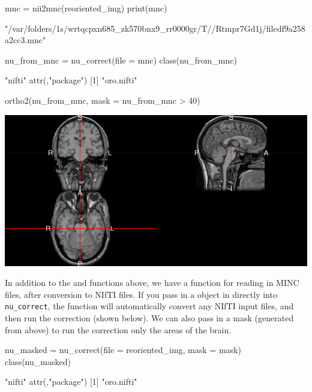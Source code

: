 \begin{Schunk}
\begin{Sinput}
mnc = nii2mnc(reoriented_img)
print(mnc)
\end{Sinput}
\begin{Soutput}
[1] "/var/folders/1s/wrtqcpxn685_zk570bnx9_rr0000gr/T//Rtmpr7Gd1j/filedf9a258a2cc3.mnc"
\end{Soutput}
\begin{Sinput}
nu_from_mnc = nu_correct(file = mnc)
class(nu_from_mnc)
\end{Sinput}
\begin{Soutput}
[1] "nifti"
attr(,"package")
[1] "oro.nifti"
\end{Soutput}
\begin{Sinput}
ortho2(nu_from_mnc, mask = nu_from_mnc > 40)
\end{Sinput}

\includegraphics{Freesurfer_files/figure-latex/nu_correct_mcn2nii-1} \end{Schunk}

In addition to the  and  functions above, we
have a  function for reading in MINC files, after
conversion to NIfTI files. If you pass in a  object in
directly into \texttt{nu\_correct}, the function will automatically
convert any NIfTI input files, and then run the correction (shown
below). We can also pass in a mask (generated from above) to run the
correction only the areas of the brain.

\begin{Schunk}
\begin{Sinput}
nu_masked = nu_correct(file = reoriented_img, mask = mask)
class(nu_masked)
\end{Sinput}
\begin{Soutput}
[1] "nifti"
attr(,"package")
[1] "oro.nifti"
\end{Soutput}
\end{Schunk}

